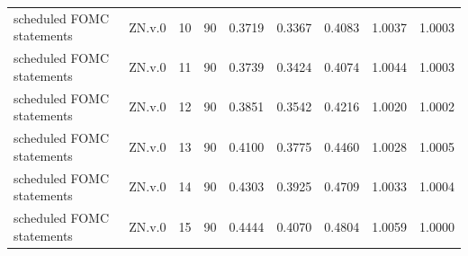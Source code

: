 \begin{tabular}{llrrrrrrr}
scheduled FOMC statements & ZN.v.0 & 10 & 90 & 0.3719 & 0.3367 & 0.4083 & 1.0037 & 1.0003 \\
scheduled FOMC statements & ZN.v.0 & 11 & 90 & 0.3739 & 0.3424 & 0.4074 & 1.0044 & 1.0003 \\
scheduled FOMC statements & ZN.v.0 & 12 & 90 & 0.3851 & 0.3542 & 0.4216 & 1.0020 & 1.0002 \\
scheduled FOMC statements & ZN.v.0 & 13 & 90 & 0.4100 & 0.3775 & 0.4460 & 1.0028 & 1.0005 \\
scheduled FOMC statements & ZN.v.0 & 14 & 90 & 0.4303 & 0.3925 & 0.4709 & 1.0033 & 1.0004 \\
scheduled FOMC statements & ZN.v.0 & 15 & 90 & 0.4444 & 0.4070 & 0.4804 & 1.0059 & 1.0000 \\
\bottomrule
\end{tabular}
